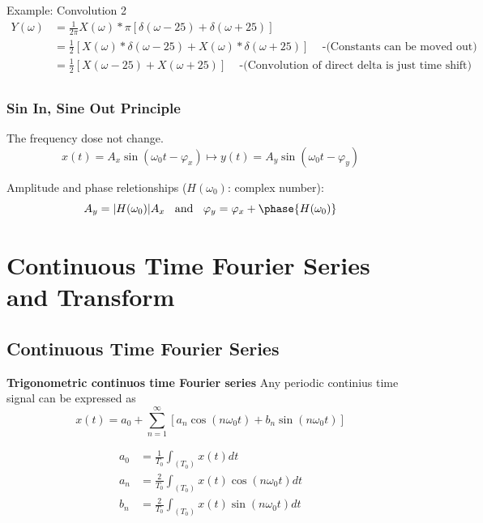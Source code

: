 \begin{exampleblock}{Example: Convolution 2}
\begin{align*}
    Y(\omega) &= \frac{1}{2\pi}X(\omega) * \pi [\delta(\omega-25)+\delta(\omega+25)] \\
    &= \frac{1}{2}[X(\omega)*\delta(\omega-25) + X(\omega)*\delta(\omega+25)] \;\;\; \text{ -(Constants can be moved out)} \\
    &= \frac{1}{2}[X(\omega-25) + X(\omega+25)] \;\;\; \text{ -(Convolution of direct delta is just time shift)} \\
\end{align*}    
\end{exampleblock}



\subsubsection{Sin In, Sine Out Principle}
The frequency dose not change.
\begin{equation}
    x(t)=A_x\sin(\omega_0t-\varphi_x) \mapsto y(t)=A_y\sin(\omega_0t-\varphi_y)
\end{equation}

Amplitude and phase reletionships ($H(\omega_0)$: complex number):
\begin{equation}
    A_y=|H(\omega_0)|A_x \;\; \text{ and } \;\; \varphi_y=\varphi_x+\phase{H(\omega_0)}
\end{equation}


\section{Continuous Time Fourier Series and Transform}
\subsection{Continuous Time Fourier Series}
\textbf{Trigonometric continuos time Fourier series}
Any periodic continius time signal can be expressed as
\begin{equation*}
    x(t) = a_0 + \sum_{n=1}^{\infty} [a_n\cos(n\omega_0t) + b_n\sin(n\omega_0t)]
\end{equation*}

\begin{align*}
    a_0 &= \frac{1}{T_0}\int_{(T_0)} x(t) dt \\
    a_n &= \frac{2}{T_0}\int_{(T_0)} x(t)\cos(n\omega_0t) dt \\
    b_n &= \frac{2}{T_0}\int_{(T_0)} x(t)\sin(n\omega_0t) dt \\
\end{align*}

